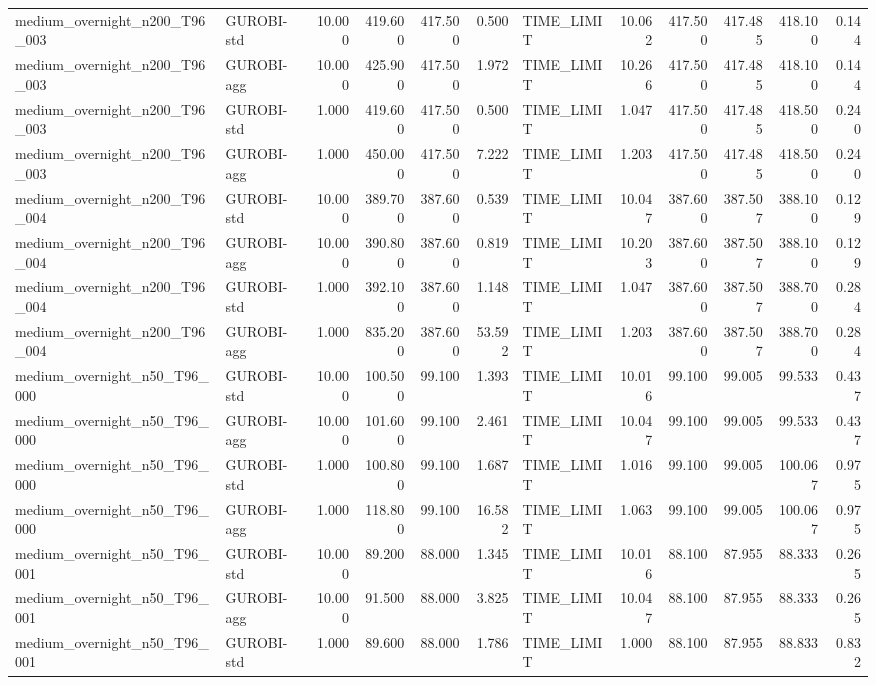 \begin{table}[htbp]
\begin{tabular}{llrrrrlrrrrr}
medium\_overnight\_n200\_T96\_003 & GUROBI-std & 10.000 & 419.600 & 417.500 & 0.500 & TIME\_LIMIT & 10.062 & 417.500 & 417.485 & 418.100 & 0.144 \\
medium\_overnight\_n200\_T96\_003 & GUROBI-agg & 10.000 & 425.900 & 417.500 & 1.972 & TIME\_LIMIT & 10.266 & 417.500 & 417.485 & 418.100 & 0.144 \\
medium\_overnight\_n200\_T96\_003 & GUROBI-std & 1.000 & 419.600 & 417.500 & 0.500 & TIME\_LIMIT & 1.047 & 417.500 & 417.485 & 418.500 & 0.240 \\
medium\_overnight\_n200\_T96\_003 & GUROBI-agg & 1.000 & 450.000 & 417.500 & 7.222 & TIME\_LIMIT & 1.203 & 417.500 & 417.485 & 418.500 & 0.240 \\
medium\_overnight\_n200\_T96\_004 & GUROBI-std & 10.000 & 389.700 & 387.600 & 0.539 & TIME\_LIMIT & 10.047 & 387.600 & 387.507 & 388.100 & 0.129 \\
medium\_overnight\_n200\_T96\_004 & GUROBI-agg & 10.000 & 390.800 & 387.600 & 0.819 & TIME\_LIMIT & 10.203 & 387.600 & 387.507 & 388.100 & 0.129 \\
medium\_overnight\_n200\_T96\_004 & GUROBI-std & 1.000 & 392.100 & 387.600 & 1.148 & TIME\_LIMIT & 1.047 & 387.600 & 387.507 & 388.700 & 0.284 \\
medium\_overnight\_n200\_T96\_004 & GUROBI-agg & 1.000 & 835.200 & 387.600 & 53.592 & TIME\_LIMIT & 1.203 & 387.600 & 387.507 & 388.700 & 0.284 \\
medium\_overnight\_n50\_T96\_000 & GUROBI-std & 10.000 & 100.500 & 99.100 & 1.393 & TIME\_LIMIT & 10.016 & 99.100 & 99.005 & 99.533 & 0.437 \\
medium\_overnight\_n50\_T96\_000 & GUROBI-agg & 10.000 & 101.600 & 99.100 & 2.461 & TIME\_LIMIT & 10.047 & 99.100 & 99.005 & 99.533 & 0.437 \\
medium\_overnight\_n50\_T96\_000 & GUROBI-std & 1.000 & 100.800 & 99.100 & 1.687 & TIME\_LIMIT & 1.016 & 99.100 & 99.005 & 100.067 & 0.975 \\
medium\_overnight\_n50\_T96\_000 & GUROBI-agg & 1.000 & 118.800 & 99.100 & 16.582 & TIME\_LIMIT & 1.063 & 99.100 & 99.005 & 100.067 & 0.975 \\
medium\_overnight\_n50\_T96\_001 & GUROBI-std & 10.000 & 89.200 & 88.000 & 1.345 & TIME\_LIMIT & 10.016 & 88.100 & 87.955 & 88.333 & 0.265 \\
medium\_overnight\_n50\_T96\_001 & GUROBI-agg & 10.000 & 91.500 & 88.000 & 3.825 & TIME\_LIMIT & 10.047 & 88.100 & 87.955 & 88.333 & 0.265 \\
medium\_overnight\_n50\_T96\_001 & GUROBI-std & 1.000 & 89.600 & 88.000 & 1.786 & TIME\_LIMIT & 1.000 & 88.100 & 87.955 & 88.833 & 0.832 \\

\end{tabular}
\end{table}
